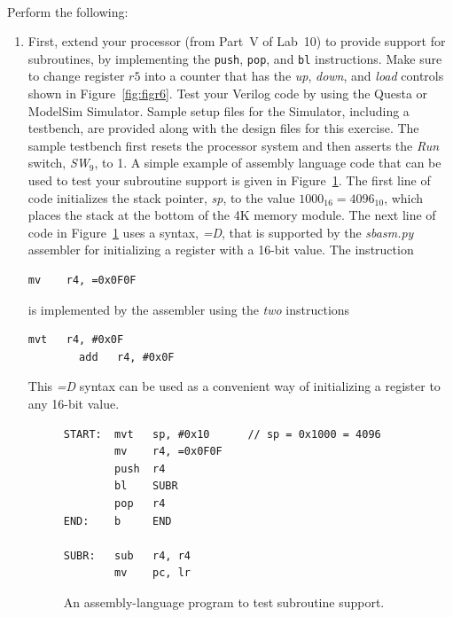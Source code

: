 \documentclass[epsfig,10pt,fullpage]{article} \addtolength{\textwidth}{1.5in}
\begin{document}
~\\
\noindent
Perform the following:
\begin{enumerate}
\item First, extend your processor (from Part~V of Lab~10) to
provide support for subroutines, by implementing the \texttt{push}, \texttt{pop}, 
and \texttt{bl} instructions. Make sure to change register $r5$ into a counter that 
has the {\it up}, {\it down}, and {\it load} controls shown in Figure~\ref{fig:figr6}.
Test your Verilog code by using the Questa or ModelSim Simulator. Sample 
setup files for the Simulator, including a testbench, are provided 
along with the design files for this exercise.  The sample testbench first resets the processor
system and then asserts the {\it Run} switch, {\it SW}$_9$, to 1. 
A simple example of assembly language code that can be used to test your subroutine support is 
given in Figure~\ref{fig:subr}. The first line of code initializes the stack pointer, {\it sp},
to the value $1000_{16} = 4096_{10}$, which places the stack at the bottom of the 4K memory 
module. The next line of code in Figure~\ref{fig:subr} uses a syntax, {\it =D}, that is supported 
by the {\it sbasm.py} assembler for initializing a register with a 16-bit value. The instruction

\begin{lstlisting}[name=subr]
        mv    r4, =0x0F0F
\end{lstlisting}

is implemented by the assembler using the {\it two} instructions

\begin{lstlisting}[name=subr]
        mvt   r4, #0x0F
        add   r4, #0x0F
\end{lstlisting}

This {\it =D} syntax can be used as a convenient way of initializing a register to 
any 16-bit value. 

\lstset{language=ASM,numbers=none,escapechar=|}
\begin{figure}[]
\begin{center}
\begin{minipage}[H]{12.5 cm}
\begin{lstlisting}[name=subr]
START:  mvt   sp, #0x10      // sp = 0x1000 = 4096
        mv    r4, =0x0F0F    
        push  r4
        bl    SUBR
        pop   r4
END:    b     END

SUBR:   sub   r4, r4
        mv    pc, lr
\end{lstlisting}
\end{minipage}
\caption{An assembly-language program to test subroutine support.}
\label{fig:subr}
\end{center}
\end{figure}


\end{enumerate}
\end{document}
